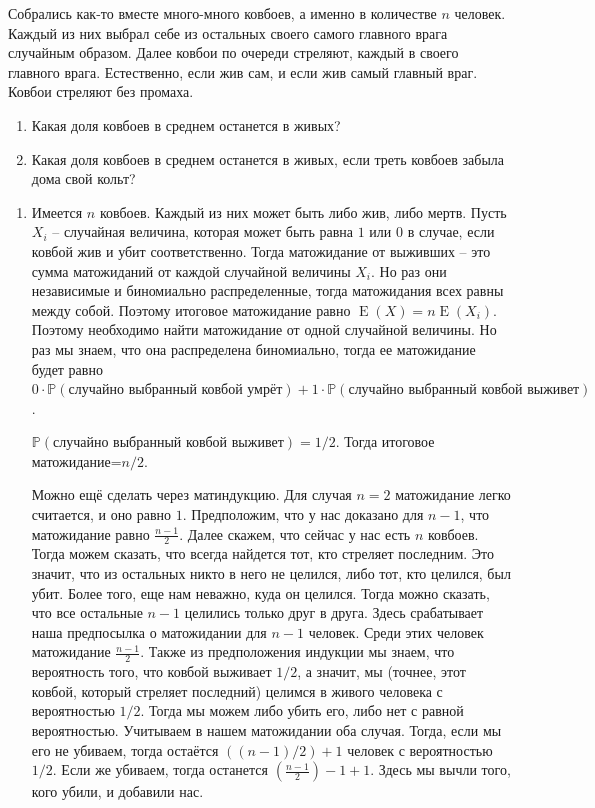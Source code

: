 \documentclass[nobib]{tufte-handout}
\theoremstyle{definition}
\newcounter{problem}
\newenvironment{problem}%
{%
\refstepcounter{problem}%
     \hypertarget{problem:{\theproblem}}{}
     \Writetofile{solution_file}{\protect\hypertarget{soln:\theproblem}{}}
     \begin{myenum}[label=\bfseries\protect\hyperlink{soln:\theproblem}{\theproblem},ref=\theproblem]
     \item%
    }%
    {%
    \end{myenum}}
\DeclareMathOperator{\E}{E}
\renewcommand{\P}{\mathbb{P}}
\begin{document}
\begin{problem}
Собрались как-то вместе много-много ковбоев, а именно в количестве $n$ человек.
Каждый из них выбрал себе из остальных своего самого главного врага случайным образом.
Далее ковбои по очереди стреляют, каждый в своего главного врага.
Естественно, если жив сам, и если жив самый главный враг.
Ковбои стреляют без промаха.
\begin{enumerate}
\item Какая доля ковбоев в среднем останется в живых?
\item Какая доля ковбоев в среднем останется в живых,
если треть ковбоев забыла дома свой кольт?
\end{enumerate}


\begin{sol}
\begin{enumerate}
\item Имеется $n$ ковбоев. Каждый из них может быть либо жив, либо мертв.
Пусть $X_i$ – случайная величина, которая может быть равна $1$ или $0$ в случае,
если ковбой жив и убит соответственно. Тогда матожидание от выживших –
это сумма матожиданий от каждой случайной величины $X_i$.
Но раз они независимые и биномиально распределенные,
тогда матожидания всех равны между собой.
Поэтому итоговое матожидание равно $\E(X) = n\E(X_{i})$.
Поэтому необходимо найти матожидание от одной случайной величины.
Но раз мы знаем, что она распределена биномиально, тогда ее матожидание
будет равно $0\cdot\P(\text{случайно выбранный ковбой умрёт})+
1\cdot\P(\text{случайно выбранный ковбой выживет})$.

$\P(\text{случайно выбранный ковбой выживет}) =1/2$.  Тогда итоговое матожидание=$n/2$.

Можно ещё сделать через матиндукцию. Для случая $n=2$ матожидание легко считается,
и оно равно $1$. Предположим, что у нас доказано для $n-1$,
что матожидание равно $\frac{n-1}{2}$. Далее скажем, что сейчас у нас есть $n$ ковбоев.
Тогда можем сказать, что всегда найдется тот, кто стреляет последним.
Это значит, что из остальных никто в него не целился, либо тот,
кто целился, был убит. Более того, еще нам неважно, куда он целился.
Тогда можно сказать, что все остальные $n-1$ целились только друг в друга.
Здесь срабатывает наша предпосылка о матожидании для $n-1$ человек.
Среди этих человек матожидание $\frac{n-1}{2}$. Также из предположения индукции
мы знаем, что вероятность того, что ковбой выживает $1/2$,
а значит, мы (точнее, этот ковбой, который стреляет последний) целимся
в живого человека с вероятностью $1/2$. Тогда мы можем либо убить его,
либо нет с равной вероятностью. Учитываем в нашем матожидании оба случая.
Тогда, если мы его не убиваем, тогда остаётся $((n-1)/2)+1$
человек с вероятностью $1/2$. Если же убиваем,
тогда останется $\left(\frac{n-1}{2}\right) -1+1$. Здесь мы вычли того,
кого убили, и добавили нас.


\end{enumerate}
\end{sol}
\end{problem}
\end{document}
